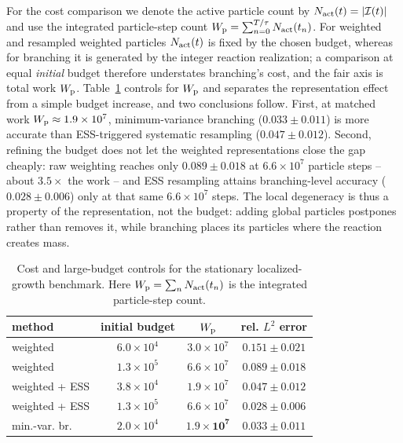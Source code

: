 \documentclass[a4paper,fleqn]{cas-sc}
\theoremstyle{definition}
\theoremstyle{remark}
\begin{document}
For the cost comparison we denote the active particle count by
\(N_{\rm act}(t)=|\mathcal I(t)|\) and use the integrated particle-step count
\(W_{\rm p}=\sum_{n=0}^{T/\tau}N_{\rm act}(t_n)\).  For weighted and resampled weighted
particles \(N_{\rm act}(t)\) is fixed by the chosen budget, whereas for branching it is
generated by the integer reaction realization; a comparison at equal \emph{initial} budget
therefore understates branching's cost, and the fair axis is total work \(W_{\rm p}\).
Table~\ref{tab:bw_cost} controls for \(W_{\rm p}\) and separates the representation effect
from a simple budget increase, and two conclusions follow.  First, at matched work
\(W_{\rm p}\approx1.9\times10^7\), minimum-variance branching (\(0.033\pm0.011\)) is more
accurate than ESS-triggered systematic resampling (\(0.047\pm0.012\)).  Second, refining
the budget does not let the weighted representations close the gap cheaply: raw weighting
reaches only \(0.089\pm0.018\) at \(6.6\times10^7\) particle steps -- about \(3.5\times\)
the work -- and ESS resampling attains branching-level accuracy (\(0.028\pm0.006\)) only at
that same \(6.6\times10^7\) steps.  The local degeneracy is thus a property of the
representation, not the budget: adding global particles postpones rather than removes it,
while branching places its particles where the reaction creates mass.
\begin{table}[t]
\centering
\caption{Cost and large-budget controls for the stationary localized-growth benchmark.
Here \(W_{\rm p}=\sum_n N_{\rm act}(t_n)\) is the integrated particle-step count.}
\label{tab:bw_cost}
\begin{tabular}{l c c c}
\toprule
method & initial budget & \(W_{\rm p}\) & rel. \(L^2\) error \\
\midrule
weighted & \(6.0\times10^4\) & \(3.0\times10^7\) & \(0.151\pm0.021\) \\
weighted & \(1.3\times10^5\) & \(6.6\times10^7\) & \(0.089\pm0.018\) \\
weighted + ESS & \(3.8\times10^4\) & \(1.9\times10^7\) & \(0.047\pm0.012\) \\
weighted + ESS & \(1.3\times10^5\) & \(6.6\times10^7\) & \(0.028\pm0.006\) \\
min.-var. br. & \(2.0\times10^4\) & \(\mathbf{1.9\times10^7}\) & \(\mathbf{0.033\pm0.011}\) \\
\bottomrule
\end{tabular}
\end{table}
 
\end{document}
